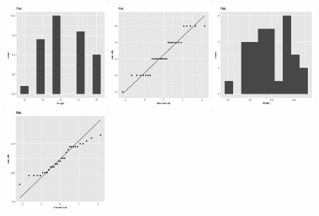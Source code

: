 \begin{center}
	\includegraphics[width=1.5in]{1_Hei_a_hist.png}
	\includegraphics[width=1.5in]{1_Hei_a_qq.png}
	\includegraphics[width=1.5in]{1_Hei_w_hist.png}
	\includegraphics[width=1.5in]{1_Hei_w_qq.png}
\end{center}
